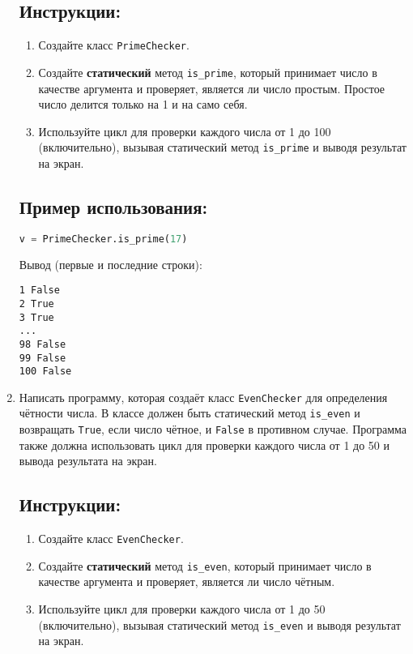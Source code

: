 \begin{enumerate}
\subsection*{Инструкции:}
\begin{enumerate}
    \item Создайте класс \texttt{PrimeChecker}.
    \item Создайте \textbf{статический} метод \texttt{is\_prime}, который принимает число в качестве аргумента и проверяет, является ли число простым. Простое число делится только на 1 и на само себя.
    \item Используйте цикл для проверки каждого числа от 1 до 100 (включительно), вызывая статический метод \texttt{is\_prime} и выводя результат на экран.
\end{enumerate}

\subsection*{Пример использования:}
\begin{lstlisting}[language=Python]
    v = PrimeChecker.is_prime(17)
\end{lstlisting}
Вывод (первые и последние строки):
\begin{verbatim}
1 False
2 True
3 True
...
98 False
99 False
100 False
\end{verbatim}

\item
Написать программу, которая создаёт класс \texttt{EvenChecker} 
для определения чётности числа. В классе должен быть статический метод
\texttt{is\_even} и возвращать \texttt{True}, если число чётное, 
и \texttt{False} в противном случае. 
Программа также должна использовать цикл для проверки каждого числа от 
1 до 50 и вывода результата на экран.

\subsection*{Инструкции:}
\begin{enumerate}
    \item Создайте класс \texttt{EvenChecker}.
    \item Создайте \textbf{статический} метод \texttt{is\_even}, который принимает число в качестве аргумента и проверяет, является ли число чётным.
    \item Используйте цикл для проверки каждого числа от 1 до 50 (включительно), вызывая статический метод \texttt{is\_even} и выводя результат на экран.
\end{enumerate}


\end{enumerate}
